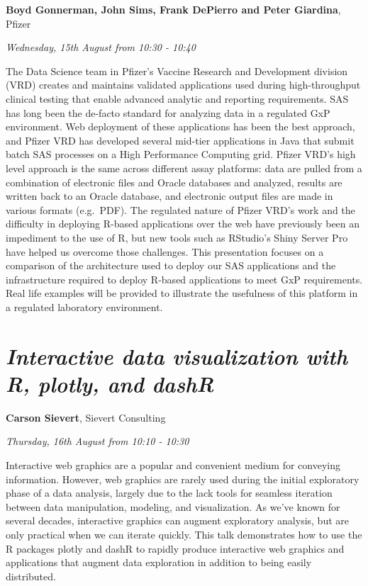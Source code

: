 \documentclass[]{book}
\theoremstyle{definition}
\theoremstyle{definition}
\theoremstyle{definition}
\theoremstyle{remark}
\begin{document}
\textbf{Boyd Gonnerman, John Sims, Frank DePierro and Peter Giardina},
Pfizer

\emph{Wednesday, 15th August from 10:30 - 10:40}

The Data Science team in Pfizer's Vaccine Research and Development
division (VRD) creates and maintains validated applications used during
high-throughput clinical testing that enable advanced analytic and
reporting requirements. SAS has long been the de-facto standard for
analyzing data in a regulated GxP environment. Web deployment of these
applications has been the best approach, and Pfizer VRD has developed
several mid-tier applications in Java that submit batch SAS processes on
a High Performance Computing grid. Pfizer VRD's high level approach is
the same across different assay platforms: data are pulled from a
combination of electronic files and Oracle databases and analyzed,
results are written back to an Oracle database, and electronic output
files are made in various formats (e.g.~PDF). The regulated nature of
Pfizer VRD's work and the difficulty in deploying R-based applications
over the web have previously been an impediment to the use of R, but new
tools such as RStudio's Shiny Server Pro have helped us overcome those
challenges. This presentation focuses on a comparison of the
architecture used to deploy our SAS applications and the infrastructure
required to deploy R-based applications to meet GxP requirements. Real
life examples will be provided to illustrate the usefulness of this
platform in a regulated laboratory environment.

\hypertarget{interactive-data-visualization-with-r-plotly-and-dashr}{%
\section{\texorpdfstring{\emph{Interactive data visualization with R,
plotly, and
dashR}}{Interactive data visualization with R, plotly, and dashR}}\label{interactive-data-visualization-with-r-plotly-and-dashr}}

\textbf{Carson Sievert}, Sievert Consulting

\emph{Thursday, 16th August from 10:10 - 10:30}

Interactive web graphics are a popular and convenient medium for
conveying information. However, web graphics are rarely used during the
initial exploratory phase of a data analysis, largely due to the lack
tools for seamless iteration between data manipulation, modeling, and
visualization. As we've known for several decades, interactive graphics
can augment exploratory analysis, but are only practical when we can
iterate quickly. This talk demonstrates how to use the R packages plotly
and dashR to rapidly produce interactive web graphics and applications
that augment data exploration in addition to being easily distributed.
\end{document}
